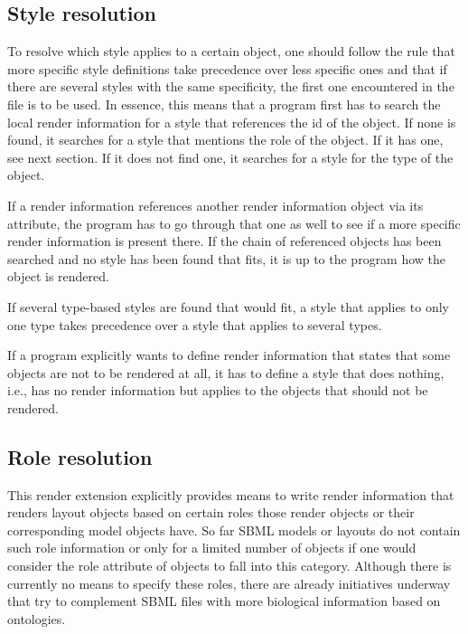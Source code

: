 \subsection{Style resolution}
\label{style-res}

To resolve which style applies to a certain object, one 
should follow the rule that more specific style definitions take precedence 
over less specific ones and that if there are several styles with the same 
specificity, the first one encountered in the file is to be used. In essence,
this means that a program first has to search the local render information for 
a style that references the id of the object. If none is found, it searches for 
a style that mentions the role of the object. If it has one, see next section. 
If it does not find one, it searches for a style for the type of the object. 

If a render information references another render information object via its 
 attribute, the program has to go through 
that one as well to see if a more specific render information is present there. 
If the chain of referenced \RenderInformation objects has been searched and no 
style has been found that fits, it is up to the program how the object is 
rendered. 

If several type-based styles are found 
that would fit, a style that applies to only one type takes precedence over a 
style that applies to several types.

If a program explicitly wants to define render information that 
states that some objects are not to be rendered at all, it has to define a 
style that does nothing, i.e., has no render information but applies to the 
objects that should not be rendered. 


\subsection{Role resolution}
\label{role-res}

This render extension explicitly provides means to write render information
that renders layout objects based on certain roles those render objects or their
corresponding model objects have. So far SBML models or layouts do not contain
such role information or only for a limited number of objects if one would
consider the role attribute of  objects to fall into this category.
Although there is currently no means to specify these roles, there are already
initiatives underway that try to complement SBML files with more biological
information based on ontologies.  

